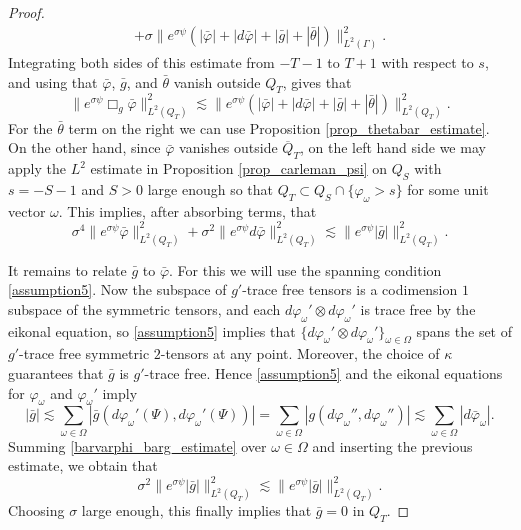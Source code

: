 \documentclass[11pt,letterpaper]{amsart}
\theoremstyle{definition}
\numberwithin{equation}{section}
\newcommand{\norm}[1]{\lVert #1 \rVert}         %
\newcommand{\ol}[1]{\overline{#1}}
\begin{document}
\begin{proof}
\begin{multline*}
 + \sigma \norm{e^{\sigma \psi} (|\bar{\varphi}| + |d \bar{\varphi}| + |\bar{g}| + |\bar{\theta}|)}_{L^2(\Gamma)}^2.
\end{multline*}
Integrating both sides of this estimate from $-T-1$ to $T+1$ with respect to $s$, and using that $\bar{\varphi}$, $\bar{g}$, and $\bar{\theta}$ vanish outside $Q_T$, gives that 
\[
\norm{e^{\sigma \psi} \Box_g \bar{\varphi}}_{L^2(Q_T)}^2 \lesssim \norm{e^{\sigma \psi} (|\bar{\varphi}| + |d \bar{\varphi}| + |\bar{g}| + |\bar{\theta}|)}_{L^2(Q_T)}^2.
\]
For the $\bar{\theta}$ term on the right we can use Proposition \ref{prop_thetabar_estimate}. On the other hand, since $\bar{\varphi}$ vanishes outside $\ol{Q}_T$, on the left hand side we may apply the $L^2$ estimate in Proposition \ref{prop_carleman_psi} on $Q_S$ with $s = -S - 1$ and $S > 0$ large enough so that $Q_T \subset Q_S \cap \{\varphi_\omega > s\}$ for some unit vector $\omega$. This implies, after absorbing terms, that 
\begin{equation} \label{barvarphi_barg_estimate}
\sigma^4 \norm{e^{\sigma \psi} \bar{\varphi}}_{L^2(Q_T)}^2 + \sigma^2 \norm{e^{\sigma \psi} d \bar{\varphi}}_{L^2(Q_T)}^2 \lesssim \norm{e^{\sigma \psi} |\bar{g}|}_{L^2(Q_T)}^2.
\end{equation}

It remains to relate $\bar{g}$ to $\bar{\varphi}$. For this we will use the spanning condition \eqref{assumption5}. Now the subspace of $g'$-trace free tensors is a codimension $1$ subspace of the symmetric tensors, and each $d \varphi_{\omega}' \otimes d \varphi_{\omega}'$ is trace free by the eikonal equation, so \eqref{assumption5}  implies that $\{ d \varphi_{\omega}' \otimes d \varphi_{\omega}' \}_{\omega \in \Omega}$ spans the set of $g'$-trace free symmetric $2$-tensors at any point. Moreover, the choice of $\kappa$ guarantees that $\bar g$ is $g'$-trace free.
Hence \eqref{assumption5} and the eikonal equations for $\varphi_{\omega}$ and $\varphi_{\omega}'$ imply 
\[
|\bar{g}| \lesssim \sum_{\omega \in \Omega} |\bar{g}(d \varphi_{\omega}'(\Psi), d \varphi_{\omega}'(\Psi))| = \sum_{\omega \in \Omega} |g(d \varphi_{\omega}'', d \varphi_{\omega}'')| \lesssim \sum_{\omega \in \Omega} |d \bar{\varphi}_{\omega}|.
\]
Summing \eqref{barvarphi_barg_estimate} over $\omega \in \Omega$ and inserting the previous estimate, we obtain that  
\[
\sigma^2 \norm{e^{\sigma \psi} |\bar{g}|}_{L^2(Q_T)}^2 \lesssim \norm{e^{\sigma \psi} |\bar{g}|}_{L^2(Q_T)}^2.
\]
Choosing $\sigma$ large enough, this finally implies that $\bar{g} = 0$ in $Q_T$.
\end{proof}
\end{document}
